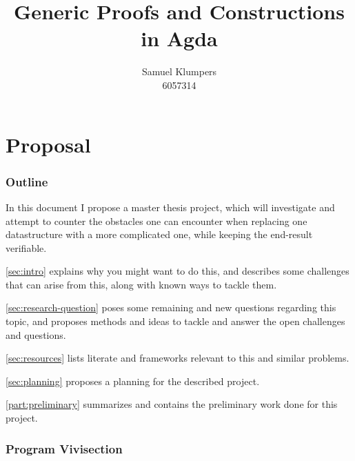 \documentclass{article}
\title{Generic Proofs and Constructions in Agda}
\author{Samuel Klumpers\\6057314}
\theoremstyle{plain}%
\theoremstyle{definition}
\begin{document}
\maketitle
\tableofcontents

\newpage

\begin{comment}
\begin{abstract} %
    This thesis introduces the concepts of the structure identity principle, numerical representations, and ornamentations, and aims to combine these to simplify the presentation and verification of finger trees, demonstrating the generalizability and improved compactness and security of the resulting code. 
\end{abstract}
\end{comment}


\part{Proposal}
\section{Outline}
In this document I propose a master thesis project, which will investigate and attempt to counter the obstacles one can encounter when replacing one datastructure with a more complicated one, while keeping the end-result verifiable.

\autoref{sec:intro} explains why you might want to do this, and describes some challenges that can arise from this, along with known ways to tackle them.

\autoref{sec:research-question} poses some remaining and new questions regarding this topic, and proposes methods and ideas to tackle and answer the open challenges and questions.

\autoref{sec:resources} lists literate and frameworks relevant to this and similar problems.

\autoref{sec:planning} proposes a planning for the described project.

\autoref{part:preliminary} summarizes and contains the preliminary work done for this project.

\section{Program Vivisection}\label{sec:intro}

\end{document}
